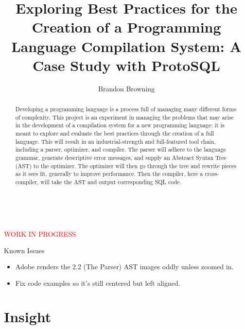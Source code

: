 \documentclass[titlepage]{article}
\begin{document}
	\thispagestyle{empty}
	\vspace*{\fill}
		~\centerline{\textcolor{red}{\Huge{WORK IN PROGRESS}}}
		\newline\newline

		\large{Known Issues}
		\begin{itemize}
			\item Adobe renders the 2.2 (The Parser) AST images oddly unless zoomed in.
			\item Fix code examples so it's still centered but left aligned.
		\end{itemize}

		\listoftodos
	\vspace*{\fill}

	\newpage

	\thispagestyle{empty}
	\title{Exploring Best Practices for the Creation of a Programming Language Compilation System: A Case Study with ProtoSQL}
	\author{Brandon Browning}
	\maketitle

	\begin{abstract}
		Developing a programming language is a process full of managing many different forms of complexity.  This project is an experiment in managing the problems that may arise in the development of a compilation system for a new programming language; it is meant to explore and evaluate the best practices through the creation of a full language.  This will result in an industrial-strength and full-featured tool chain, including a parser, optimizer, and compiler.  The parser will adhere to the language grammar, generate descriptive error messages, and supply an Abstract Syntax Tree (AST) to the optimizer.  The optimizer will then go through the tree and rewrite pieces as it sees fit, generally to improve performance.  Then the compiler, here a cross-compiler, will take the AST and output corresponding SQL code.

	\end{abstract}

	\newpage

	\thispagestyle{empty}
	\tableofcontents
	\listoffigures

	\newpage

	\setcounter{page}{1}

	\section{Insight}
\end{document}
